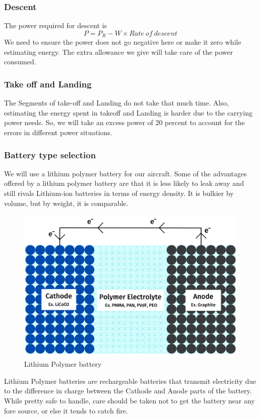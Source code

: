 \documentclass[12 pt]{article}
\begin{document}
\subsubsection{Descent}
The power required for descent is 
$$ P = P_R - W \times Rate\: of\: descent$$
We need to ensure the power does not go negative here or make it zero while estimating energy. The extra allowance we give will take care of the power consumed.

\subsubsection{Take off and Landing}
The Segments of take-off and Landing do not take that much time. Also, estimating the energy spent in takeoff and Landing is harder due to the carrying power needs. So, we will take an excess power of 20 percent to account for the errors in different power situations.

\subsubsection{Battery type selection \cite{Lipobattery}}

We will use a lithium polymer battery for our aircraft. Some of the advantages offered by a lithium polymer battery are that it is less likely to leak away and still rivals Lithium-ion batteries in terms of energy density. It is bulkier by volume, but by weight, it is comparable.

\begin{figure}[h]
    \centering
    \includegraphics[width=0.5\linewidth]{Extra pics/LiPo_battery_diagram.png}
    \caption{Lithium Polymer battery}
    \label{Lithium Polymer battery}
\end{figure}

Lithium Polymer batteries are rechargeable batteries that transmit electricity due to the difference in charge between the Cathode and Anode parts of the battery. While pretty safe to handle, care should be taken not to get the battery near any fore source, or else it tends to catch fire.
\end{document}

